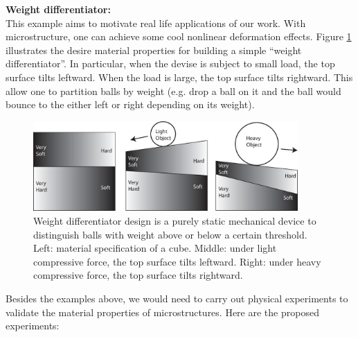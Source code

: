 \begin{description}
\item{\bf Weight differentiator:}\\
This example aims to motivate real life applications of our work.  With
microstructure, one can achieve some cool nonlinear deformation effects. Figure
\ref{fig:weight_differentiator} illustrates the desire material properties for
building a simple ``weight differentiator''.  In particular, when the devise is
subject to small load, the top surface tilts leftward.  When the load is large,
the top surface tilts rightward.  This allow one to partition balls by weight
(e.g. drop a ball on it and the ball would bounce to the either left or right
depending on its weight).

\begin{figure}
\centering
\includegraphics[width=0.9\textwidth]{images/weight_differentiator}
\caption{
Weight differentiator design is a purely static mechanical device to distinguish balls
with weight above or below a certain threshold.
Left: material specification of a cube.  Middle: under light
compressive force, the top surface tilts leftward.  Right: under heavy
compressive force, the top surface tilts rightward.}
\label{fig:weight_differentiator}
\end{figure}

\end{description}

Besides the examples above, we would need to carry out physical experiments to
validate the material properties of microstructures.  Here are the proposed
experiments:

